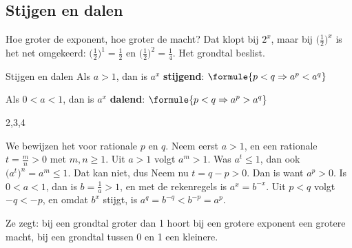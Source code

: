 \subsection{Stijgen en dalen}

Hoe groter de exponent, hoe groter de macht? Dat klopt bij $2^x$, maar bij $\bigl(\frac12\bigr)^x$ is het net omgekeerd: $\bigl(\frac12\bigr)^1 = \frac12$ en $\bigl(\frac12\bigr)^2 = \frac14$. Het grondtal beslist.

\begin{theorie}
\begin{stelling}{Stijgen en dalen}
Als $a > 1$, dan is $a^x$ \textbf{stijgend}: \qquad $\formule{p < q \Rightarrow a^p < a^q}$

Als $0 < a < 1$, dan is $a^x$ \textbf{dalend}: \qquad $\formule{p < q \Rightarrow a^p > a^q}$
\end{stelling}
\begin{alleenvoor}{2,3,4}
\begin{bewijs}
We bewijzen het voor rationale $p$ en $q$. Neem eerst $a > 1$, en een rationale $t = \frac{m}{n} > 0$ met $m, n \geqslant 1$. Uit $a > 1$ volgt $a^m > 1$. Was $a^t \leqslant 1$, dan ook $\bigl(a^t\bigr)^n = a^m \leqslant 1$. Dat kan niet, dus
Neem nu $t = q - p > 0$. Dan is
want $a^p > 0$. Is $0 < a < 1$, dan is $b = \frac1a > 1$, en met de rekenregels is $a^x = b^{-x}$. Uit $p < q$ volgt $-q < -p$, en omdat $b^x$ stijgt, is $a^q = b^{-q} < b^{-p} = a^p$.
\end{bewijs}
\end{alleenvoor}
\end{theorie}

 Ze zegt: bij een grondtal groter dan 1 hoort bij een grotere exponent een grotere macht, bij een grondtal tussen 0 en 1 een kleinere.


